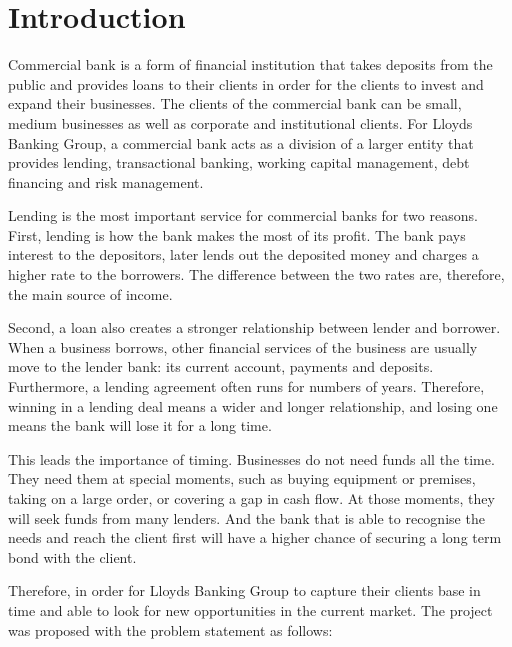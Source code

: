\documentclass[ %
                    author={Natchalin Iwsakul \\[0.4em] Inkaphol Siriwongwattana \\[0.4em] Tanaphan Kummaraphat \\[0.6em] Patorn Srisupap},,
                supervisor={Fernando Moreno-Pino},
                    degree={MSc},
                     title={Propensity Modelling for SME Commercial Lending Using Open Public Data
},
                  subtitle={Companies House and GDELT as predictors of first-time borrowing},
                      type={},
                      year={2026}]{dissertation}
\begin{document}
\mainmatter


\chapter{Introduction}
\label{chap:introduction}

\vspace{1cm} 

\noindent

Commercial bank is a form of financial institution that takes deposits from the public and provides loans to their clients in order for the clients to invest and expand their businesses. The clients of the commercial bank can be small, medium businesses as well as corporate and institutional clients. For Lloyds Banking Group, a commercial bank acts as a division of a larger entity that provides lending, transactional banking, working capital management, debt financing and risk management.

Lending is the most important service for commercial banks for two reasons. First, lending is how the bank makes the most of its profit. The bank pays interest to the depositors, later lends out the deposited money and charges a higher rate to the borrowers. The difference between the two rates are, therefore, the main source of income.

Second, a loan also creates a stronger relationship between lender and borrower. When a business borrows, other financial services of the business are usually move to the lender bank: its current account, payments and deposits. Furthermore, a lending agreement often runs for numbers of years. Therefore, winning in a lending deal means a wider and longer relationship, and losing one means the bank will lose it for a long time.

This leads the importance of timing. Businesses do not need funds all the time. They need them at special moments, such as buying equipment or premises, taking on a large order, or covering a gap in cash flow. At those moments,  they will seek funds from many lenders. And the bank that is able to recognise the needs and reach the client first will have a higher chance of securing a long term bond with the client.

Therefore, in order for Lloyds Banking Group to capture their clients base in time and able to look for new opportunities in the current market. The project was proposed with the problem statement as follows:
\end{document}
